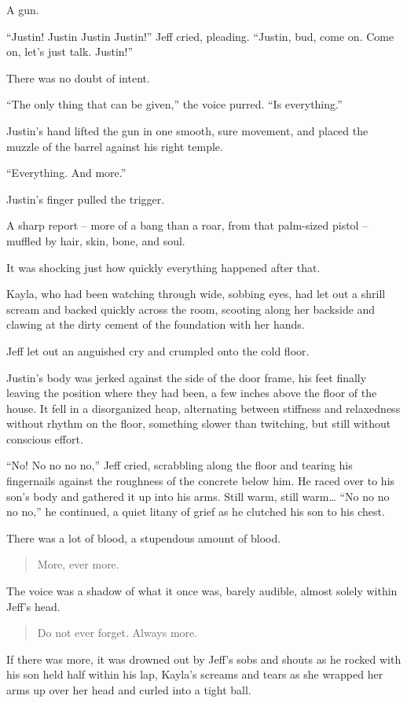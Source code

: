 A gun.

``Justin!  Justin Justin Justin!'' Jeff cried, pleading.  ``Justin, bud, come on.  Come on, let's just talk.  Justin!''

There was no doubt of intent.

``The only thing that can be given,'' the voice purred.  ``Is everything.''

Justin's hand lifted the gun in one smooth, sure movement, and placed the muzzle of the barrel against his right temple.

``Everything.  And more.''

Justin's finger pulled the trigger.

\secdiv

A sharp report -- more of a bang than a roar, from that palm-sized pistol -- muffled by hair, skin, bone, and soul.

It was shocking just how quickly everything happened after that.

Kayla, who had been watching through wide, sobbing eyes, had let out a shrill scream and backed quickly across the room, scooting along her backside and clawing at the dirty cement of the foundation with her hands.

Jeff let out an anguished cry and crumpled onto the cold floor.

Justin's body was jerked against the side of the door frame, his feet finally leaving the position where they had been, a few inches above the floor of the house.  It fell in a disorganized heap, alternating between stiffness and relaxedness without rhythm on the floor, something slower than twitching, but still without conscious effort.

``No!  No no no no,'' Jeff cried, scrabbling along the floor and tearing his fingernails against the roughness of the concrete below him.  He raced over to his son's body and gathered it up into his arms.  Still warm, still warm\ldots{} ``No no no no no,'' he continued, a quiet litany of grief as he clutched his son to his chest.

There was a lot of blood, a stupendous amount of blood.

\secdiv

\begin{quote}
  More, ever more.
\end{quote}

The voice was a shadow of what it once was, barely audible, almost solely within Jeff's head.

\begin{quote}
  Do not ever forget.  Always more.
\end{quote}

If there was more, it was drowned out by Jeff's sobs and shouts as he rocked with his son held half within his lap, Kayla's screams and tears as she wrapped her arms up over her head and curled into a tight ball.
